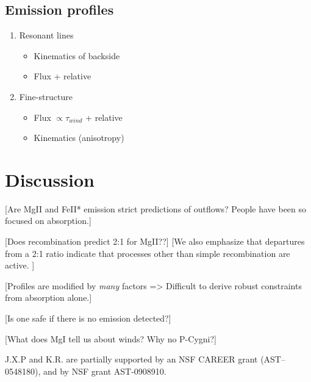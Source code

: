\documentclass[12pt,preprint]{aastex}
\begin{document}
\subsection{Emission profiles}

 \begin{enumerate}
   \item Resonant lines
     \begin{itemize}
       \item Kinematics of backside
       \item Flux + relative
    \end{itemize}
   \item Fine-structure
     \begin{itemize}
       \item Flux $\propto \tau_{wind}$ + relative
       \item Kinematics (anisotropy)
    \end{itemize}
 \end{enumerate}
     

\section{Discussion}

[Are MgII and FeII* emission strict predictions of outflows?  People
have been so focused on absorption.]

[Does recombination predict 2:1 for MgII??]
[We also emphasize that departures from a 2:1
ratio indicate that processes other than simple recombination are
active. ]

[Profiles are modified by {\it many} factors => Difficult to derive
robust constraints from absorption alone.]

[Is one safe if there is no emission detected?]

[What does MgI tell us about winds?  Why no P-Cygni?]

\acknowledgments

J.X.P and K.R. are partially supported
by an NSF CAREER grant (AST--0548180), and 
by NSF grant AST-0908910.

\clearpage

%
%



\clearpage






\end{document}
